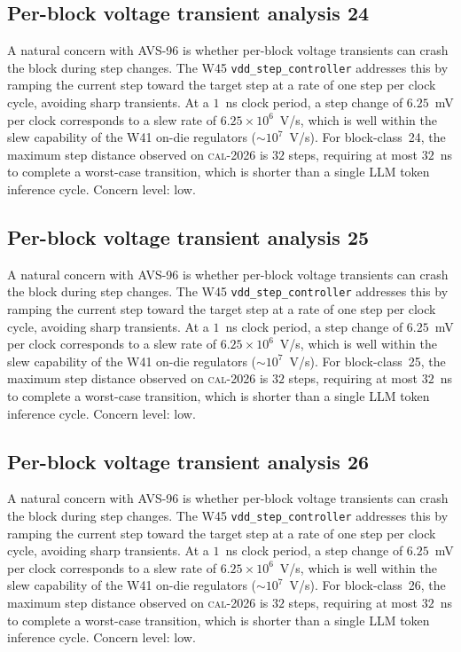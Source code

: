 \subsection{Per-block voltage transient analysis 24}

A natural concern with AVS-96 is whether per-block voltage transients
can crash the block during step changes. The W45 \texttt{vdd\_step\_controller} addresses this by ramping the current
step toward the target step at a rate of one step per clock cycle,
avoiding sharp transients. At a $1$~ns clock period, a step change of
$6.25$~mV per clock corresponds to a slew rate of $6.25\times 10^6$~V/s,
which is well within the slew capability of the W41 on-die regulators
($\sim 10^7$~V/s). For block-class~24, the maximum step distance
observed on \textsc{cal-2026} is $32$ steps, requiring at most $32$~ns
to complete a worst-case transition, which is shorter than a single
LLM token inference cycle. Concern level: low.


\subsection{Per-block voltage transient analysis 25}

A natural concern with AVS-96 is whether per-block voltage transients
can crash the block during step changes. The W45 \texttt{vdd\_step\_controller} addresses this by ramping the current
step toward the target step at a rate of one step per clock cycle,
avoiding sharp transients. At a $1$~ns clock period, a step change of
$6.25$~mV per clock corresponds to a slew rate of $6.25\times 10^6$~V/s,
which is well within the slew capability of the W41 on-die regulators
($\sim 10^7$~V/s). For block-class~25, the maximum step distance
observed on \textsc{cal-2026} is $32$ steps, requiring at most $32$~ns
to complete a worst-case transition, which is shorter than a single
LLM token inference cycle. Concern level: low.


\subsection{Per-block voltage transient analysis 26}

A natural concern with AVS-96 is whether per-block voltage transients
can crash the block during step changes. The W45 \texttt{vdd\_step\_controller} addresses this by ramping the current
step toward the target step at a rate of one step per clock cycle,
avoiding sharp transients. At a $1$~ns clock period, a step change of
$6.25$~mV per clock corresponds to a slew rate of $6.25\times 10^6$~V/s,
which is well within the slew capability of the W41 on-die regulators
($\sim 10^7$~V/s). For block-class~26, the maximum step distance
observed on \textsc{cal-2026} is $32$ steps, requiring at most $32$~ns
to complete a worst-case transition, which is shorter than a single
LLM token inference cycle. Concern level: low.


